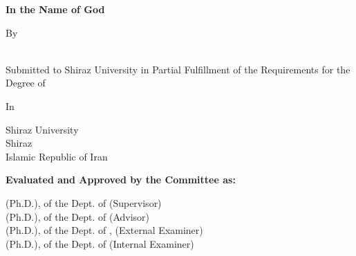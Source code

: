 \thispagestyle{empty}
\begin{latin}
    \begin{center}
        \textbf{In the Name of God}
        \vspace{5mm}
        
        \textbf{\large \titleEN}
        \vspace{5mm}
    
        By \\
        \textbf{\authorEN}
        \vspace{5mm}
        
        {\typeEN} \\
        Submitted to Shiraz University in Partial Fulfillment of the Requirements for the Degree of {\levelEN}
        \vspace{5mm}
        
       In \\
       {\fieldEN}
        \vspace{5mm}
        
        Shiraz University \\
        Shiraz \\
        Islamic Republic of Iran \\
    \end{center}
    \vspace{5mm}
    
    \noindent
    \textbf{Evaluated and Approved by the {\typeEN} Committee as: {\gradeEN}}

    \noindent
    {\supervisorEN} (Ph.D.), {\supervisorgradEN} of the Dept. of {\supervisordeptEN} (Supervisor) \dotfill \\
    {\advisorEN} (Ph.D.), {\advisorgradEN} of the Dept. of {\advisordeptEN} (Advisor) \dotfill \\
    {\extrefEN} (Ph.D.), {\extrefgradEN} of the Dept. of {\extrefdeptEN}, {\extrefuniEN} (External Examiner) \dotfill \\
    {} (Ph.D.), {} of the Dept. of {} (Internal Examiner) \dotfill \\
    
    \begin{center}
        {\dateEN}
    \end{center}
\end{latin}